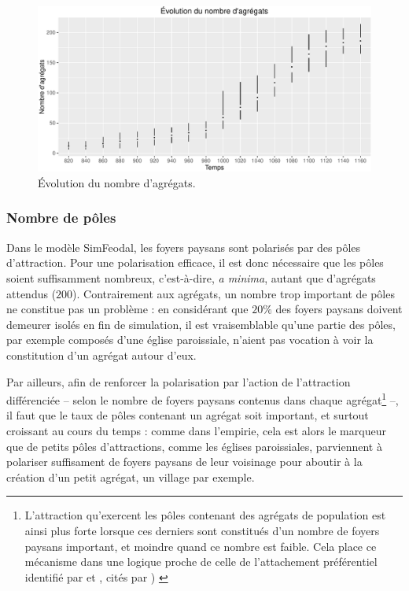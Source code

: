 \begin{figure}[H]
\captionsetup{width=\linewidth}
\includegraphics[width=0.5\linewidth]{img/resultats/v0_nombre_agregats.pdf}
\caption{Évolution du nombre d'agrégats.}
\label{fig:nombre-agregats-v0}
\end{figure}


\clearpage

\subsubsection{Nombre de pôles}\label{para:nb-poles}

Dans le modèle SimFeodal, les foyers paysans sont polarisés par des pôles d'attraction.
Pour une polarisation efficace, il est donc nécessaire que les pôles soient suffisamment nombreux, c'est-à-dire, \textit{a minima}, autant que d'agrégats attendus ($200$).
Contrairement aux agrégats, un nombre trop important de pôles ne constitue pas un problème :
en considérant que $20\%$ des foyers paysans doivent demeurer isolés en fin de simulation, il est vraisemblable qu'une partie des pôles, par exemple composés d'une église paroissiale, n'aient pas vocation à voir la constitution d'un agrégat autour d'eux.

Par ailleurs, afin de renforcer la polarisation par l'action de l'attraction différenciée -- selon le nombre de foyers paysans contenus dans chaque agrégat\footnote{\label{ftn:preferential-attachment}
L'attraction qu'exercent les pôles contenant des agrégats de population est ainsi plus forte lorsque ces derniers sont constitués d'un nombre de foyers paysans important, et moindre quand ce nombre est faible.
Cela place ce mécanisme dans une logique proche de celle de l'attachement préférentiel identifié par \cite{yule1925ii} et \cite{simon1955class}, cités par \cite[93]{schmittModelisationDynamiqueSystemes2014}) \label{ftn:attachement-preferentiel}
} --, il faut que le taux de pôles contenant un agrégat soit important, et surtout croissant au cours du temps :
comme dans l'empirie, cela est alors le marqueur que de petits pôles d'attractions, comme les églises paroissiales, parviennent à polariser suffisament de foyers paysans de leur voisinage pour aboutir à la création d'un petit agrégat, un village par exemple.

